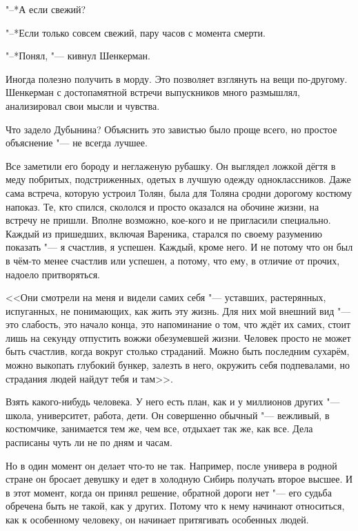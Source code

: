 "--*А если свежий?

"--*Если только совсем свежий, пару часов с момента смерти.

"--*Понял, "--- кивнул Шенкерман.

\asterism

Иногда полезно получить в морду.
Это позволяет взглянуть на вещи по-другому.
Шенкерман с достопамятной встречи выпускников много размышлял, анализировал свои мысли и чувства.

Что задело Дубынина?
Объяснить это завистью было проще всего, но простое объяснение "--- не всегда лучшее.

Все заметили его бороду и неглаженую рубашку.
Он выглядел ложкой дёгтя в меду побритых, подстриженных, одетых в лучшую одежду одноклассников.
Даже сама встреча, которую устроил Толян, была для Толяна сродни дорогому костюму напоказ.
Те, кто спился, скололся и просто оказался на обочине жизни, на встречу не пришли.
Вполне возможно, кое-кого и не пригласили специально.
Каждый из пришедших, включая Вареника, старался по своему разумению показать "--- я счастлив, я успешен.
Каждый, кроме него.
И не потому что он был в чём-то менее счастлив или успешен, а потому, что ему, в отличие от прочих, надоело притворяться.

<<Они смотрели на меня и видели самих себя "--- уставших, растерянных, испуганных, не понимающих, как жить эту жизнь.
Для них мой внешний вид "--- это слабость, это начало конца, это напоминание о том, что ждёт их самих, стоит лишь на секунду отпустить вожжи обезумевшей жизни.
Человек просто не может быть счастлив, когда вокруг столько страданий.
Можно быть последним сухарём, можно выкопать глубокий бункер, залезть в него, окружить себя подпевалами, но страдания людей найдут тебя и там>>.

\textspace

Взять какого-нибудь человека.
У него есть план, как и у миллионов других "--- школа, университет, работа, дети.
Он совершенно обычный "--- вежливый, в костюмчике, занимается тем же, чем все, отдыхает так же, как все.
Дела расписаны чуть ли не по дням и часам.

Но в один момент он делает что-то не так.
Например, после универа в родной стране он бросает девушку и едет в холодную Сибирь получать второе высшее.
И в этот момент, когда он принял решение, обратной дороги нет "--- его судьба обречена быть не такой, как у других.
Потому что к нему начинают относиться, как к особенному человеку, он начинает притягивать особенных людей.

